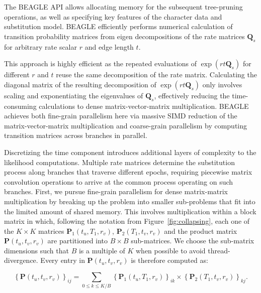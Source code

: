 The BEAGLE API allows allocating memory for the subsequent tree-pruning operations, as well as specifying key features of the character data and substitution model.  
BEAGLE efficiently performs numerical calculation of transition probability matrices from eigen decompositions of the rate matrices $\mathbf{Q}_{s}$ for arbitrary rate scalar $r$ and edge length $t$.

This approach is highly efficient as the repeated evaluations of $\exp\left(rt\mathbf{Q}_s\right)$ for different $r$ and $t$ reuse the same decomposition of the rate matrix.
Calculating the diagonal matrix of the resulting decomposition of $\exp\left(rt\mathbf{Q}_s\right)$ only involves scaling and exponentiating the eigenvalues of $\mathbf{Q}_s$, effectively reducing the time-consuming calculations to dense matrix-vector-matrix multiplication.
BEAGLE achieves both 
fine-grain parallelism here via massive SIMD reduction of the matrix-vector-matrix multiplication and
coarse-grain parallelism by computing transition matrices across branches in parallel.  

\newcommand{\blockSize}{\ensuremath{B}}

Discretizing the time component introduces additional layers of complexity to the likelihood computations. 
Multiple rate matrices determine the substitution process along branches that traverse different epochs, requiring piecewise matrix convolution operations to arrive at the common process operating on such branches.  
First, we pursue fine-grain parallelism for dense matrix-matrix multiplication by breaking up the problem into smaller sub-problems that fit into the limited amount of shared memory. 
This involves multiplication within a block matrix in which, following the notation from Figure~\ref{fig:collapsing}, each one of the $K \times K$ matrices $\mathbf{P}_{1}(t_u, T_1, r_v)$, $\mathbf{P}_{2}(T_1, t_v, r_v)$ and the product matrix $\mathbf{P}(t_u, t_v, r_v)$ are partitioned into $\blockSize \times \blockSize$ sub-matrices. 
We choose the sub-matrix dimensions such that $\blockSize$ is a multiple of $K$ when possible to avoid thread-divergence. 
Every entry in $\mathbf{P}(t_u, t_v, r_v)$ is therefore computed as:

\begin{equation}
\left\{ \mathbf{P}(t_{u},t_{v},r_{v})\right\} _{ij}=\underset{0\leq k\leq
K / \blockSize
}
{\sum}\left\{ \mathbf{P}_{1}(t_{u},T_1,r_{v})\right\} _{ik}\times\left\{ \mathbf{P}_{2}(T_1,t_{v},r_{v})\right\} _{kj} .
\end{equation}

